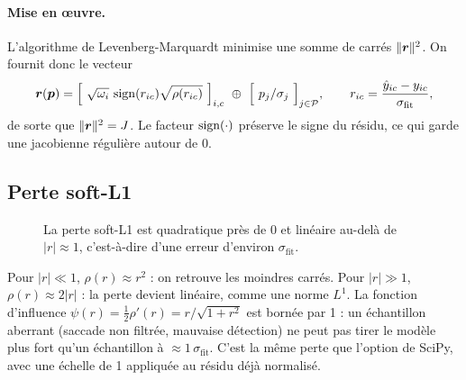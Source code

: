 \paragraph{Mise en œuvre.} L'algorithme de Levenberg-Marquardt minimise une somme de carrés $\|\bm{r}\|^2$. On fournit donc le vecteur
\begin{equation}
  \vect{r}(\vect{p}) = \Big[\ \sqrt{\omega_i}\,\sign(r_{ic})\sqrt{\rho(r_{ic})}\ \Big]_{i,c} \ \oplus\ \Big[\ p_j/\sigma_j\ \Big]_{j\in\mathcal P},
  \qquad r_{ic} = \frac{\hat y_{ic} - y_{ic}}{\sigma_\text{fit}},
\end{equation}
de sorte que $\|\bm{r}\|^2 = J$. Le facteur $\operatorname{sign}(\cdot)$ préserve le signe du résidu, ce qui garde une jacobienne régulière autour de 0.

\subsection{Perte soft-L1}

\begin{figure}[H]
\centering
{}
\caption{La perte soft-L1 est quadratique près de 0 et linéaire au-delà de $|r| \approx 1$, c'est-à-dire d'une erreur d'environ $\sigma_\text{fit}$.}
\end{figure}

Pour $|r| \ll 1$, $\rho(r) \approx r^2$ : on retrouve les moindres carrés. Pour $|r| \gg 1$, $\rho(r) \approx 2|r|$ : la perte devient linéaire, comme une norme $L^1$. La fonction d'influence $\psi(r) = \tfrac12\rho'(r) = r/\sqrt{1 + r^2}$ est bornée par 1 : un échantillon aberrant (saccade non filtrée, mauvaise détection) ne peut pas tirer le modèle plus fort qu'un échantillon à $\approx 1\,\sigma_\text{fit}$. C'est la même perte que l'option  de SciPy, avec une échelle de \num{1} appliquée au résidu déjà normalisé.

